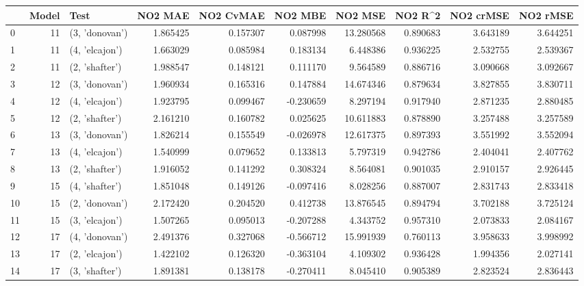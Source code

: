 \begin{tabular}{lrlrrrrrrr}
\toprule
{} &  Model &            Test &   NO2 MAE &  NO2 CvMAE &   NO2 MBE &    NO2 MSE &   NO2 R\textasciicircum2 &  NO2 crMSE &  NO2 rMSE \\
\midrule
0  &     11 &  (3, 'donovan') &  1.865425 &   0.157307 &  0.087998 &  13.280568 &  0.890683 &   3.643189 &  3.644251 \\
1  &     11 &  (4, 'elcajon') &  1.663029 &   0.085984 &  0.183134 &   6.448386 &  0.936225 &   2.532755 &  2.539367 \\
2  &     11 &  (2, 'shafter') &  1.988547 &   0.148121 &  0.111170 &   9.564589 &  0.886716 &   3.090668 &  3.092667 \\
3  &     12 &  (3, 'donovan') &  1.960934 &   0.165316 &  0.147884 &  14.674346 &  0.879634 &   3.827855 &  3.830711 \\
4  &     12 &  (4, 'elcajon') &  1.923795 &   0.099467 & -0.230659 &   8.297194 &  0.917940 &   2.871235 &  2.880485 \\
5  &     12 &  (2, 'shafter') &  2.161210 &   0.160782 &  0.025625 &  10.611883 &  0.878890 &   3.257488 &  3.257589 \\
6  &     13 &  (3, 'donovan') &  1.826214 &   0.155549 & -0.026978 &  12.617375 &  0.897393 &   3.551992 &  3.552094 \\
7  &     13 &  (4, 'elcajon') &  1.540999 &   0.079652 &  0.133813 &   5.797319 &  0.942786 &   2.404041 &  2.407762 \\
8  &     13 &  (2, 'shafter') &  1.916052 &   0.141292 &  0.308324 &   8.564081 &  0.901035 &   2.910157 &  2.926445 \\
9  &     15 &  (4, 'shafter') &  1.851048 &   0.149126 & -0.097416 &   8.028256 &  0.887007 &   2.831743 &  2.833418 \\
10 &     15 &  (2, 'donovan') &  2.172420 &   0.204520 &  0.412738 &  13.876545 &  0.894794 &   3.702188 &  3.725124 \\
11 &     15 &  (3, 'elcajon') &  1.507265 &   0.095013 & -0.207288 &   4.343752 &  0.957310 &   2.073833 &  2.084167 \\
12 &     17 &  (4, 'donovan') &  2.491376 &   0.327068 & -0.566712 &  15.991939 &  0.760113 &   3.958633 &  3.998992 \\
13 &     17 &  (2, 'elcajon') &  1.422102 &   0.126320 & -0.363104 &   4.109302 &  0.936428 &   1.994356 &  2.027141 \\
14 &     17 &  (3, 'shafter') &  1.891381 &   0.138178 & -0.270411 &   8.045410 &  0.905389 &   2.823524 &  2.836443 \\

\end{tabular}
